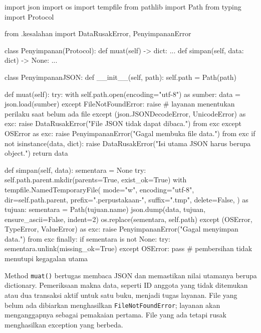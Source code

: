 \begin{kode}
import json
import os
import tempfile
from pathlib import Path
from typing import Protocol

from .kesalahan import DataRusakError, PenyimpananError


class Penyimpanan(Protocol):
    def muat(self) -> dict: ...
    def simpan(self, data: dict) -> None: ...


class PenyimpananJSON:
    def __init__(self, path):
        self.path = Path(path)

    def muat(self):
        try:
            with self.path.open(encoding="utf-8") as sumber:
                data = json.load(sumber)
        except FileNotFoundError:
            raise  # layanan menentukan perilaku saat belum ada file
        except (json.JSONDecodeError, UnicodeError) as exc:
            raise DataRusakError("File JSON tidak dapat dibaca.") from exc
        except OSError as exc:
            raise PenyimpananError("Gagal membuka file data.") from exc
        if not isinstance(data, dict):
            raise DataRusakError("Isi utama JSON harus berupa object.")
        return data

    def simpan(self, data):
        sementara = None
        try:
            self.path.parent.mkdir(parents=True, exist_ok=True)
            with tempfile.NamedTemporaryFile(
                mode="w", encoding="utf-8", dir=self.path.parent,
                prefix=".perpustakaan-", suffix=".tmp", delete=False,
            ) as tujuan:
                sementara = Path(tujuan.name)
                json.dump(data, tujuan, ensure_ascii=False, indent=2)
            os.replace(sementara, self.path)
        except (OSError, TypeError, ValueError) as exc:
            raise PenyimpananError("Gagal menyimpan data.") from exc
        finally:
            if sementara is not None:
                try:
                    sementara.unlink(missing_ok=True)
                except OSError:
                    pass  # pembersihan tidak menutupi kegagalan utama
\end{kode}

Method \texttt{muat()} bertugas membaca JSON dan memastikan nilai utamanya berupa dictionary. Pemeriksaan makna data, seperti ID anggota yang tidak ditemukan atau dua transaksi aktif untuk satu buku, menjadi tugas layanan. File yang belum ada dibiarkan menghasilkan \texttt{FileNotFoundError}; layanan akan menganggapnya sebagai pemakaian pertama. File yang ada tetapi rusak menghasilkan exception yang berbeda.

